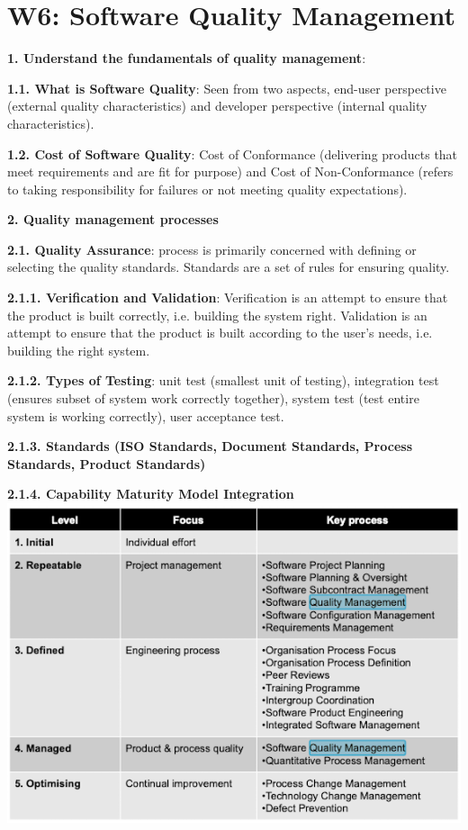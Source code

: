 \section{W6: Software Quality Management}

\textbf{1. Understand the fundamentals of quality management}: 

    \textbf{1.1. What is Software Quality}: Seen from two aspects, end-user perspective (external quality characteristics) and developer perspective (internal quality characteristics). 

    \textbf{1.2. Cost of Software Quality}: Cost of Conformance (delivering products that meet requirements and are fit for purpose) and Cost of Non-Conformance (refers to taking responsibility for failures or not meeting quality expectations).

\textbf{2. Quality management processes}

    \textbf{2.1. Quality Assurance}: process is primarily concerned with defining or selecting the quality standards. Standards are a set of rules for ensuring quality.

        \textbf{2.1.1. Verification and Validation}: Verification is an attempt to ensure that the product is built correctly, i.e. building the system right. Validation is an attempt to ensure that the product is built according to the user's needs, i.e. building the right system.

        \textbf{2.1.2. Types of Testing}: unit test (smallest unit of testing), integration test (ensures subset of system work correctly together), system test (test entire system is working correctly), user acceptance test.

        \textbf{2.1.3. Standards (ISO Standards, Document Standards, Process Standards, Product Standards)}

        \textbf{2.1.4. Capability Maturity Model Integration}
        \includegraphics[width=\linewidth]{figs/SCR-20240606-orfm.png}

